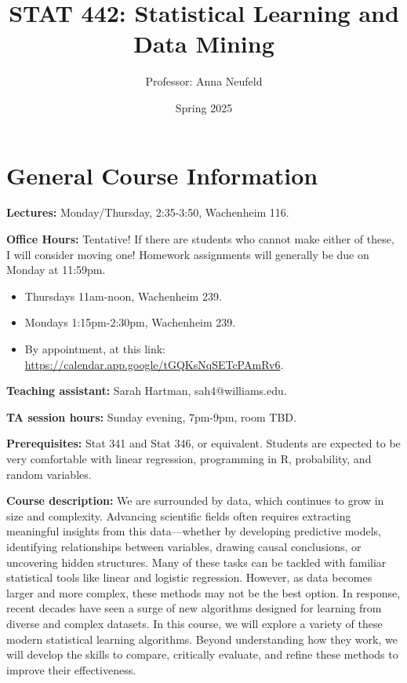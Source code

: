 \documentclass[11pt]{article}
\title{STAT 442: Statistical Learning and Data Mining}
\author{Professor: Anna Neufeld}
\date{Spring 2025}
\begin{document}
\maketitle

\noindent\makebox[\linewidth]{\rule{\textwidth}{0.4pt}}


\section{General Course Information}
\begin{list}{}{}
\item[\textbf{Lectures:}] Monday/Thursday, 2:35-3:50, Wachenheim 116.
\item[\textbf{Office Hours:}]  Tentative! If there are students who cannot make either of these, I will consider moving one! Homework assignments will generally be due on Monday at 11:59pm. 
\begin{itemize}
\item Thursdays 11am-noon, Wachenheim 239. 
\item Mondays 1:15pm-2:30pm, Wachenheim 239. 
\item By appointment, at this link: \href{https://calendar.app.google/tGQKsNqSETcPAmRv6}{https://calendar.app.google/tGQKsNqSETcPAmRv6}. 
\end{itemize}
\item[\textbf{Teaching assistant:}] Sarah Hartman, sah4@williams.edu.
\item[\textbf{TA session hours:}] Sunday evening, 7pm-9pm, room TBD. 
\item[\textbf{Prerequisites:}] Stat 341 and Stat 346, or equivalent. Students are expected to be very comfortable with linear regression, programming in R, probability, and random variables.  
 
\item[\textbf{Course description:}] We are surrounded by data, which continues to grow in size and complexity. Advancing scientific fields often requires extracting meaningful insights from this data—whether by developing predictive models, identifying relationships between variables, drawing causal conclusions, or uncovering hidden structures. Many of these tasks can be tackled with familiar statistical tools like linear and logistic regression. However, as data becomes larger and more complex, these methods may not be the best option. In response, recent decades have seen a surge of new algorithms designed for learning from diverse and complex datasets. In this course, we will explore a variety of these modern statistical learning algorithms. Beyond understanding how they work, we will develop the skills to compare, critically evaluate, and refine these methods to improve their effectiveness. 


\end{list}
\end{document}

